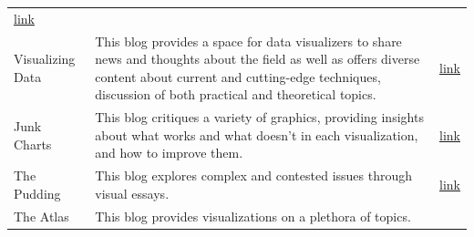 \documentclass[]{book}
\theoremstyle{definition}
\theoremstyle{definition}
\theoremstyle{definition}
\theoremstyle{remark}
\begin{document}
\begin{longtable}[]{@{}lll@{}}
\begin{minipage}[t]{0.11\columnwidth}
\href{https://flowingdata.com/}{link}\strut
\end{minipage}\tabularnewline
\begin{minipage}[t]{0.11\columnwidth}\raggedright\strut
Visualizing Data\strut
\end{minipage} & \begin{minipage}[t]{0.20\columnwidth}\raggedright\strut
This blog provides a space for data visualizers to share news and
thoughts about the field as well as offers diverse content about current
and cutting-edge techniques, discussion of both practical and
theoretical topics.\strut
\end{minipage} & \begin{minipage}[t]{0.11\columnwidth}\raggedright\strut
\href{http://www.visualisingdata.com/}{link}\strut
\end{minipage}\tabularnewline
\begin{minipage}[t]{0.11\columnwidth}\raggedright\strut
Junk Charts\strut
\end{minipage} & \begin{minipage}[t]{0.20\columnwidth}\raggedright\strut
This blog critiques a variety of graphics, providing insights about what
works and what doesn't in each visualization, and how to improve
them.\strut
\end{minipage} & \begin{minipage}[t]{0.11\columnwidth}\raggedright\strut
\href{http://junkcharts.typepad.com/}{link}\strut
\end{minipage}\tabularnewline
\begin{minipage}[t]{0.11\columnwidth}\raggedright\strut
The Pudding\strut
\end{minipage} & \begin{minipage}[t]{0.20\columnwidth}\raggedright\strut
This blog explores complex and contested issues through visual
essays.\strut
\end{minipage} & \begin{minipage}[t]{0.11\columnwidth}\raggedright\strut
\href{https://pudding.cool/}{link}\strut
\end{minipage}\tabularnewline
\begin{minipage}[t]{0.11\columnwidth}\raggedright\strut
The Atlas\strut
\end{minipage} & \begin{minipage}[t]{0.20\columnwidth}\raggedright\strut
This blog provides visualizations on a plethora of topics.\strut
\end{minipage} & \begin{minipage}[t]{0.11\columnwidth}\raggedright\strut

\end{minipage}
\end{longtable}
\end{document}
